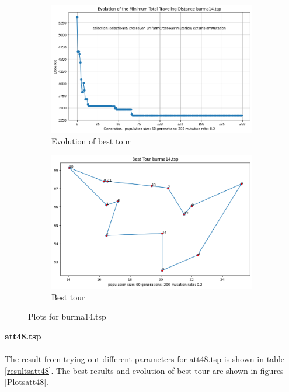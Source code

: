 \documentclass[12pt]{report}
\begin{document}
	\begin{figure}[H]
		\centering
		\begin{subfigure}{.5\textwidth}
			\centering
			\includegraphics[width=.99\linewidth]{../Results/burma14/Evolution.png}
			\caption{Evolution of best tour}
			\label{Evolutionburma14}
		\end{subfigure}%
		\begin{subfigure}{.5\textwidth}
			\centering
			\includegraphics[width=.8\linewidth]{../Results/burma14/bestTour.png}
			\caption{Best tour}
			\label{bestTourburma14}
		\end{subfigure}
		\caption{Plots for burma14.tsp}
		\label{Plotsburma14}
	\end{figure}
    \newpage
    \noindent \textbf{att48.tsp}\\
    \\
    The result from trying out different parameters for att48.tsp is shown in table \ref{resultsatt48}. The best results and evolution of best tour are shown in figures \ref{Plotsatt48}.
\end{document}
